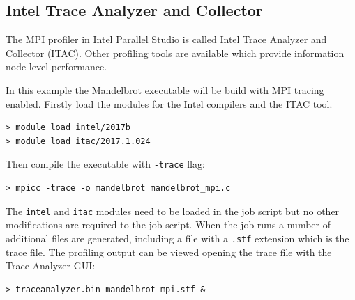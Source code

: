 \documentclass[a4paper,titlepage]{article}
\begin{document}
\subsection{Intel Trace Analyzer and Collector}

The MPI profiler in Intel Parallel Studio is called Intel Trace Analyzer and Collector (ITAC). Other profiling tools are available which provide information node-level performance.

In this example the Mandelbrot executable will be build with MPI tracing enabled. Firstly load the modules for the Intel compilers and the ITAC tool. 
\begin{verbatim}
> module load intel/2017b
> module load itac/2017.1.024
\end{verbatim}
Then compile the executable with \texttt{-trace} flag:
\begin{verbatim}
> mpicc -trace -o mandelbrot mandelbrot_mpi.c
\end{verbatim}
The \texttt{intel} and \texttt{itac} modules need to be loaded in the job script but no other modifications are required to the job script. When the job runs a number of additional files are generated, including a file with a \texttt{.stf} extension which is the trace file.
The profiling output can be viewed opening the trace file with the Trace Analyzer GUI:
\begin{verbatim}
> traceanalyzer.bin mandelbrot_mpi.stf &
\end{verbatim}
\end{document}
